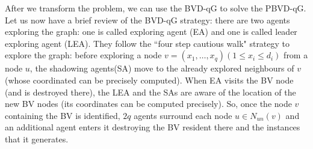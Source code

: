 After we transform the problem,   we can use the BVD-qG to solve the PBVD-qG. 
Let us  now have a brief review of the  BVD-qG strategy:  there are two agents exploring the graph: one is called exploring agent (EA) and one is called leader exploring agent (LEA). They follow the ``four step cautious walk" strategy  to explore the graph: before exploring a node $v=(x_1, \ldots, x_q) (1\leq x_i \leq d_i)$ from a node $u$, the shadowing agents(SA) move to the already explored neighbours of $v$ (whose coordinated can be precisely computed). When EA visits the BV node (and is destroyed there), the LEA and the SAs are aware of the location of the new BV nodes  (its coordinates  can be   computed precisely).
 So, once the node  $v$ containing the BV is identified, $2q$ agents surround each node $u\in N_{un}(v)$ and an additional agent enters it destroying the BV resident there and the instances that it generates. 
 


